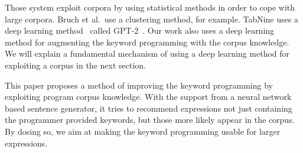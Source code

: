 \documentclass[PRO,english]{ipsj}
\begin{document}



Those system exploit corpora by using statistical methods in order to cope with large corpora.  Bruch et al.\ use a clustering method, for example.  TabNine uses a deep learning method~\cite{deep-tabnine2019} called GPT-2~\cite{radford2019language}.  Our work also uses a deep learning method for augmenting the keyword programming with the corpus knowledge.  We will explain a fundamental mechanism of using a deep learning method for exploiting a corpus in the next section.






This paper proposes a method of improving the keyword programming by exploiting program corpus knowledge.  With the support from a neural network based sentence generator, it tries to recommend expressions not just containing the programmer provided keywords, but those more likely appear in the corpus.  By dosing so, we aim at making the keyword programming usable for larger expressions.  
\end{document}
